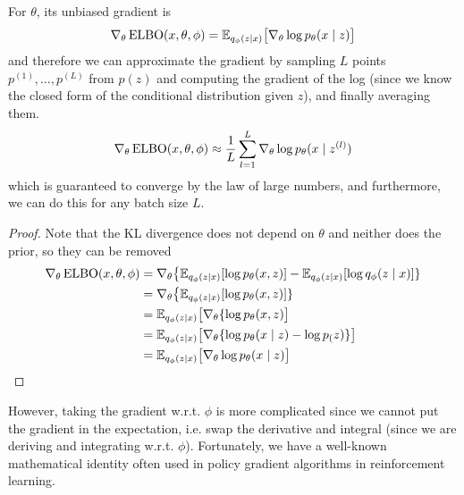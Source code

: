   \begin{lemma}
    For $\theta$, its unbiased gradient is 
    \begin{equation}
      \nabla_\theta \operatorname{ELBO}(x, \theta, \phi) = \mathbb{E}_{q_\phi (z \mid x)} \big[ \nabla_\theta \log p_\theta (x \mid z) \big]
    \end{equation}
    and therefore we can approximate the gradient by sampling $L$ points $p^{(1)}, \ldots, p^{(L)}$ from $p(z)$ and computing the gradient of the log (since we know the closed form of the conditional distribution given $z$), and finally averaging them. 
    \begin{equation}
      \nabla_\theta \operatorname{ELBO}(x, \theta, \phi) \approx \frac{1}{L} \sum_{l=1}^L \nabla_\theta \log p_\theta (x \mid z^{(l)})
    \end{equation}
    which is guaranteed to converge by the law of large numbers, and furthermore, we can do this for any batch size $L$.  
  \end{lemma}
  \begin{proof}
    Note that the KL divergence does not depend on $\theta$ and neither does the prior, so they can be removed 
    \begin{align} 
      \nabla_\theta \operatorname{ELBO}(x, \theta, \phi) & = \nabla_\theta \big\{ \mathbb{E}_{q_\phi (z \mid x)} [ \log p_\theta (x, z)] - \mathbb{E}_{q_\phi (z \mid x)} [\log q_{\phi} (z \mid x)] \} \\ 
                                           & = \nabla_\theta \big\{ \mathbb{E}_{q_\phi (z \mid x)} [ \log p_\theta (x, z)] \} \\ 
                                           & = \mathbb{E}_{q_\phi (z \mid x)} \big[ \nabla_\theta \{ \log p_\theta (x, z) \big] \\
                                           & = \mathbb{E}_{q_\phi (z \mid x)} \big[ \nabla_\theta \{ \log p_\theta (x \mid z) - \log p_(z) \} \big] \\
                                           & = \mathbb{E}_{q_\phi (z \mid x)} \big[ \nabla_\theta \log p_\theta (x \mid z) \big] 
    \end{align}
  \end{proof}

  However, taking the gradient w.r.t. $\phi$ is more complicated since we cannot put the gradient in the expectation, i.e. swap the derivative and integral (since we are deriving and integrating w.r.t. $\phi$). Fortunately, we have a well-known mathematical identity often used in policy gradient algorithms in reinforcement learning. \cite{W92} 

